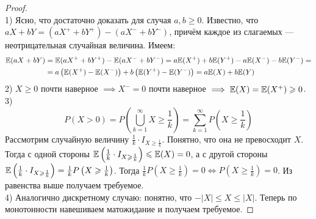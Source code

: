 \begin{proof} ~\\
    1) Ясно, что достаточно доказать для случая $a, b \geq 0$. Известно, что $aX + bY = (aX^+ + bY^+) - (aX^- + bY^-)$,
    причём каждое из слагаемых --- неотрицательная случайная величина. Имеем:
    \begin{align*}
        \mathbb{E}(aX + bY) &= \mathbb{E}(aX^+ + bY^+) - \mathbb{E}(aX^- + bY^-) = a\mathbb{E}(X^+) + b\mathbb{E}(Y^+) - a\mathbb{E}(X^-) - b\mathbb{E}(Y^-) =\\
        &=a\left( \mathbb{E}(X^+) - \mathbb{E}(X^-) \right) + b\left( \mathbb{E}(Y^+) - \mathbb{E}(Y^-) \right) = a\mathbb{E}(X) + b\mathbb{E}(Y)
    \end{align*}
    2) $X \geq 0$ почти наверное $\implies X^- = 0$ почти наверное $\implies \mathbb{E}(X) = \mathbb{E}(X^+) \geqslant 0$.\\
    3)
    \[
        P(X > 0) = P\left( \bigcup_{k = 1}^{\infty} X \geq \frac{1}{k} \right) =
        \sum\limits_{k = 1}^{\infty} P\left( X \geq \frac{1}{k} \right)
    \]
    Рассмотрим случайную величину $\frac{1}{k} \cdot I_{X \geq \frac{1}{k}}$. Понятно, что она не превосходит $X$. Тогда
    с одной стороны $\mathbb{E}\left( \frac{1}{k} \cdot I_{X \geqslant \frac{1}{k}} \right) \leqslant \mathbb{E}(X) = 0$, а с другой стороны
    $\mathbb{E}\left( \frac{1}{k} \cdot I_{X \geqslant \frac{1}{k}} \right) = \frac{1}{k}P\left( X \geqslant \frac{1}{k} \right)$.
    Тогда $\frac{1}{k}P\left( X \geq \frac{1}{k} \right) = 0 \iff P\left( X \geq \frac{1}{k} \right) = 0$. Из равенства выше
    получаем требуемое.\\
    4) Аналогично дискретному случаю: понятно, что $-|X| \leq X \leq |X|$. Теперь по монотонности навешиваем матожидание и
    получаем требуемое.
\end{proof}
